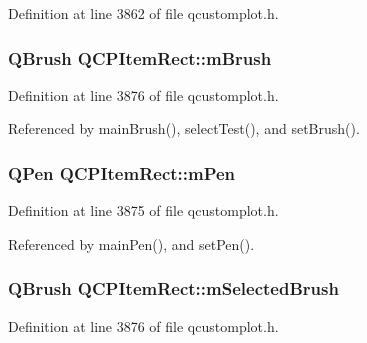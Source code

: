 Definition at line 3862 of file qcustomplot.\+h.

\hypertarget{class_q_c_p_item_rect_a2d7f207fada27588b3a52b19234d3c2e}{}
\subsubsection[{m\+Brush}]{\setlength{\rightskip}{0pt plus 5cm}Q\+Brush Q\+C\+P\+Item\+Rect\+::m\+Brush\hspace{0.3cm}{\ttfamily [protected]}}\label{class_q_c_p_item_rect_a2d7f207fada27588b3a52b19234d3c2e}


Definition at line 3876 of file qcustomplot.\+h.



Referenced by main\+Brush(), select\+Test(), and set\+Brush().

\hypertarget{class_q_c_p_item_rect_aa0d49323628d6752026056bfb52afd86}{}
\subsubsection[{m\+Pen}]{\setlength{\rightskip}{0pt plus 5cm}Q\+Pen Q\+C\+P\+Item\+Rect\+::m\+Pen\hspace{0.3cm}{\ttfamily [protected]}}\label{class_q_c_p_item_rect_aa0d49323628d6752026056bfb52afd86}


Definition at line 3875 of file qcustomplot.\+h.



Referenced by main\+Pen(), and set\+Pen().

\hypertarget{class_q_c_p_item_rect_a21b70eee59b6e19ae0bbdf037b13508f}{}
\subsubsection[{m\+Selected\+Brush}]{\setlength{\rightskip}{0pt plus 5cm}Q\+Brush Q\+C\+P\+Item\+Rect\+::m\+Selected\+Brush\hspace{0.3cm}{\ttfamily [protected]}}\label{class_q_c_p_item_rect_a21b70eee59b6e19ae0bbdf037b13508f}


Definition at line 3876 of file qcustomplot.\+h.



